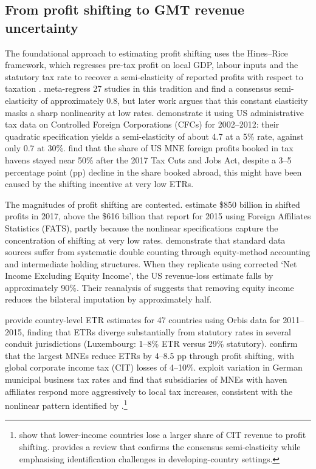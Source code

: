 \documentclass[11pt,a4paper]{article}
\begin{document}
\subsection{From profit shifting to GMT revenue uncertainty}\label{sec:beps}

The foundational approach to estimating profit shifting uses the Hines--Rice framework, which regresses pre-tax profit on local GDP, labour inputs and the statutory tax rate to recover a semi-elasticity of reported profits with respect to taxation \citep{hines1994}. \citet{heckemeyer2017} meta-regress 27 studies in this tradition and find a consensus semi-elasticity of approximately 0.8, but later work argues that this constant elasticity masks a sharp nonlinearity at low rates. \citet{dowd2017} demonstrate it using US administrative tax data on Controlled Foreign Corporations (CFCs) for 2002--2012: their quadratic specification yields a semi-elasticity of about 4.7 at a 5\% rate, against only 0.7 at 30\%. \citet{garcia-bernardo2022a} find that the share of US MNE foreign profits booked in tax havens stayed near 50\% after the 2017 Tax Cuts and Jobs Act, despite a 3--5 percentage point (pp) decline in the share booked abroad, this might have been caused by the shifting incentive at very low ETRs.

The magnitudes of profit shifting are contested. \citet{garcia-bernardo2024} estimate \$850 billion in shifted profits in 2017, above the \$616 billion that \citet{torslov2023} report for 2015 using Foreign Affiliates Statistics (FATS), partly because the nonlinear specifications capture the concentration of shifting at very low rates. \citet{blouin2023} demonstrate that standard data sources suffer from systematic double counting through equity-method accounting and intermediate holding structures. When they replicate \citet{clausing2016} using corrected `Net Income Excluding Equity Income', the US revenue-loss estimate falls by approximately 90\%. Their reanalysis of \citet{torslov2023} suggests that removing equity income reduces the bilateral imputation by approximately half. 

\citet{garcia-bernardo2023} provide country-level ETR estimates for 47 countries using Orbis data for 2011--2015, finding that ETRs diverge substantially from statutory rates in several conduit jurisdictions (Luxembourg: 1--8\% ETR versus 29\% statutory). \citet{johansson2017} confirm that the largest MNEs reduce ETRs by 4--8.5 pp through profit shifting, with global corporate income tax (CIT) losses of 4--10\%. \citet{bilicka2026} exploit variation in German municipal business tax rates and find that subsidiaries of MNEs with haven affiliates respond more aggressively to local tax increases, consistent with the nonlinear pattern identified by \citet{dowd2017}.\footnote{\citet{cobham2018} show that lower-income countries lose a larger share of CIT revenue to profit shifting. \citet{riedel2018} provides a review that confirms the consensus semi-elasticity while emphasising identification challenges in developing-country settings.}
\end{document}
